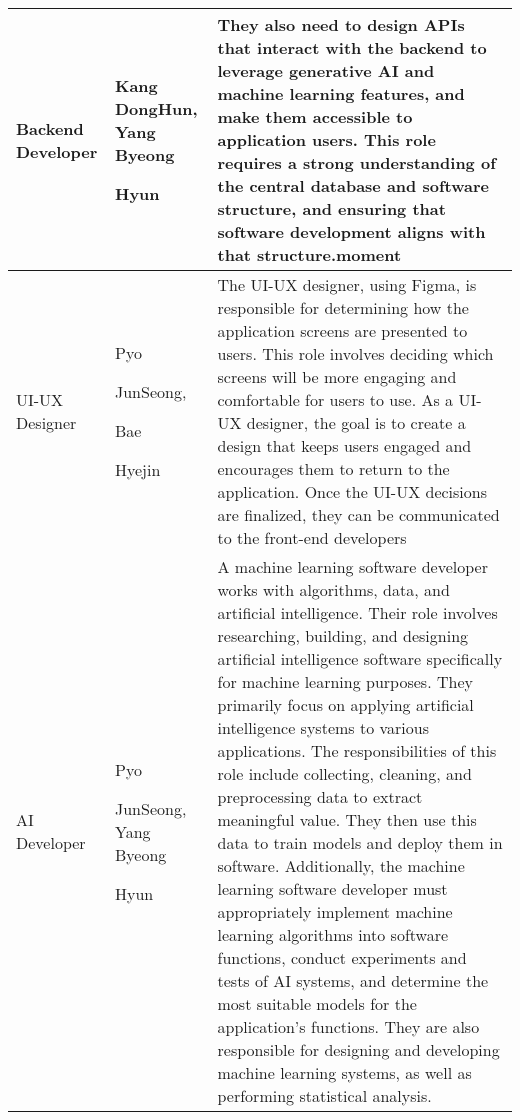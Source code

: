 \documentclass[conference]{IEEEtran}
\begin{document}
\begin{enumerate}
\begin{itemize}
\begin{itemize}
\begin{table}
\def\arraystretch{1.24} \small 

\begin{tabular}{|p{1.2cm}|p{1.2cm}|p{5.2cm}|}
    \hline
    Backend Developer & Kang DongHun,  Yang Byeong \par Hyun & They also need to design APIs that interact with the backend to leverage generative AI and machine learning features, and make them accessible to application users. This role requires a strong understanding of the central database and software structure, and ensuring that software development aligns with that structure.moment \\ 
    \hline
    UI-UX Designer & Pyo \par JunSeong, \par Bae \par Hyejin & The UI-UX designer, using Figma, is responsible for determining how the application screens are presented to users. This role involves deciding which screens will be more engaging and comfortable for users to use. As a UI-UX designer, the goal is to create a design that keeps users engaged and encourages them to return to the application. Once the UI-UX decisions are finalized, they can be communicated to the front-end developers \\ 
    \hline
    AI Developer & Pyo \par JunSeong, Yang Byeong \par Hyun & A machine learning software developer works with algorithms, data, and artificial intelligence. Their role involves researching, building, and designing artificial intelligence software specifically for machine learning purposes. They primarily focus on applying artificial intelligence systems to various applications. The responsibilities of this role include collecting, cleaning, and preprocessing data to extract meaningful value. They then use this data to train models and deploy them in software. Additionally, the machine learning software developer must appropriately implement machine learning algorithms into software functions, conduct experiments and tests of AI systems, and determine the most suitable models for the application’s functions. They are also responsible for designing and developing machine learning systems, as well as performing statistical analysis. \\
    \hline
    \end{tabular}
    \\ \\ \\ \\ \\ \\ \\ \\ \\ \\ \\ \\ 


\end{table}
\end{itemize}
\end{itemize}
\end{enumerate}
\end{document}
